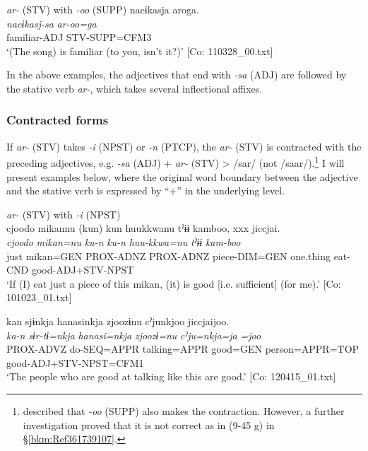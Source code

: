 \exi{}  \textit{ar-} (STV) with \textit{{}-oo} (SUPP)
\ex
\glll     nacɨkasja  aroga.\footnotemark\\
      \textit{nacɨkasj-sa}  \textit{ar-oo=ga}\\
      familiar-ADJ  STV-SUPP=CFM3\\
      \glt       ‘(The song) is familiar (to you, isn’t it?)’ [Co: 110328\_00.txt]
    \z
\z{}

In the above examples, the adjectives that end with \textit{{}-sa} (ADJ) are followed by the stative verb \textit{ar-}, which takes several inflectional affixes.

\subsubsection{Contracted forms}\label{sec:9.2.2.2}

If \textit{ar-} (STV) takes \textit{{}-i} (NPST) or \textit{{}-n} (PTCP), the \textit{ar-} (STV) is contracted with the preceding adjectives, e.g. \textit{{}-sa} (ADJ) + \textit{ar-} (STV) > /sar/ (not /saar/).\footnote{\citet[71]{Niinaga2010} described that \textit{{}-oo} (SUPP) also makes the contraction. However, a further investigation proved that it is not correct as in (9-45 g) in §\ref{bkm:Ref361739107}.} I will present examples below, where the original word boundary between the adjective and the stative verb is expressed by “+” in the underlying level.

\ea   \textit{ar-} (STV) with \textit{{}-i} (NPST) \label{ex:9.46}
  \ea\relax [= (7-25 b)]\\
    \glll  {\textbar}cjoodo  mikan{\textbar}nu  (kun)  kun  huukkwanu   tˀɨɨ  kamboo,  xxx  jiccjai.\\
      \textit{cjoodo}  \textit{mikan=nu}  \textit{ku-n}  \textit{ku-n}  \textit{huu-kkwa=nu}   \textit{tˀɨɨ}  \textit{kam-boo}    \textit{}\\
      just  mikan=GEN  PROX-ADNZ  PROX-ADNZ  piece-DIM=GEN  one.thing  eat-CND    good-ADJ+STV-NPST\\
      \glt       ‘If (I) eat just a piece of this mikan, (it) is good [i.e. sufficient] (for me).’ [Co: 101023\_01.txt]

\ex \label{ex:9.46b} %
    \glll  kan  sjɨnkja  hanasinkja  zjoozɨnu cˀjunkjoo  jiccjaijoo.\\
      \textit{ka-n}  \textit{sɨr-tɨ=nkja}  \textit{hanasi=nkja}  \textit{zjoozɨ=nu}  \textit{cˀju=nkja=ja}  \textit{=joo}\\
      PROX-ADVZ  do-SEQ=APPR  talking=APPR  good=GEN   person=APPR=TOP  good-ADJ+STV-NPST=CFM1\\
      \glt       ‘The people who are good at talking like this are good.’ [Co: 120415\_01.txt]

